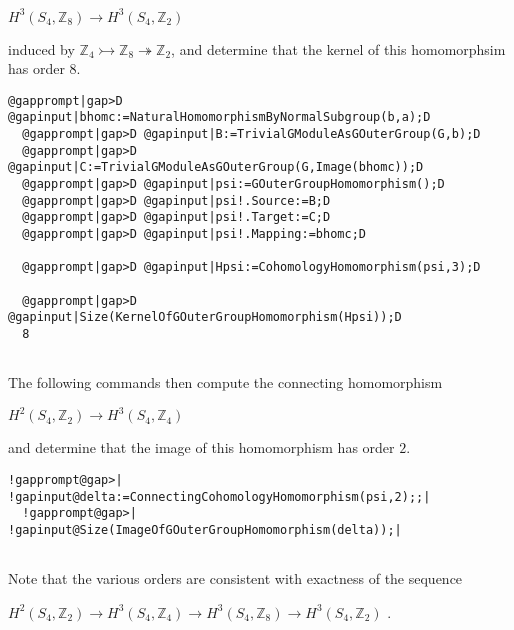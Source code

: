 \documentclass[a4paper,11pt]{report}
\begin{document}
{{$H^3(S_4,\mathbb Z_8) \rightarrow H^3(S_4,\mathbb Z_2)$ 

induced by $\mathbb Z_4 \rightarrowtail \mathbb Z_8 \twoheadrightarrow \mathbb Z_2$, and determine that the kernel of this homomorphsim has order $8$. 
\begin{Verbatim}[commandchars=@|D,fontsize=\small,frame=single,label=Example]
  @gapprompt|gap>D @gapinput|bhomc:=NaturalHomomorphismByNormalSubgroup(b,a);D
  @gapprompt|gap>D @gapinput|B:=TrivialGModuleAsGOuterGroup(G,b);D
  @gapprompt|gap>D @gapinput|C:=TrivialGModuleAsGOuterGroup(G,Image(bhomc));D
  @gapprompt|gap>D @gapinput|psi:=GOuterGroupHomomorphism();D
  @gapprompt|gap>D @gapinput|psi!.Source:=B;D
  @gapprompt|gap>D @gapinput|psi!.Target:=C;D
  @gapprompt|gap>D @gapinput|psi!.Mapping:=bhomc;D
  
  @gapprompt|gap>D @gapinput|Hpsi:=CohomologyHomomorphism(psi,3);D
  
  @gapprompt|gap>D @gapinput|Size(KernelOfGOuterGroupHomomorphism(Hpsi));D
  8
  
\end{Verbatim}
 

The following commands then compute the connecting homomorphism 

$H^2(S_4,\mathbb Z_2) \rightarrow H^3(S_4,\mathbb Z_4)$ 

and determine that the image of this homomorphism has order $2$. 
\begin{Verbatim}[commandchars=!@|,fontsize=\small,frame=single,label=Example]
  !gapprompt@gap>| !gapinput@delta:=ConnectingCohomologyHomomorphism(psi,2);;|
  !gapprompt@gap>| !gapinput@Size(ImageOfGOuterGroupHomomorphism(delta));|
  
\end{Verbatim}
 Note that the various orders are consistent with exactness of the sequence 

$H^2(S_4,\mathbb Z_2) \rightarrow H^3(S_4,\mathbb Z_4) \rightarrow
H^3(S_4,\mathbb Z_8) \rightarrow H^3(S_4,\mathbb Z_2) $ . }

 }

 
\end{document}
